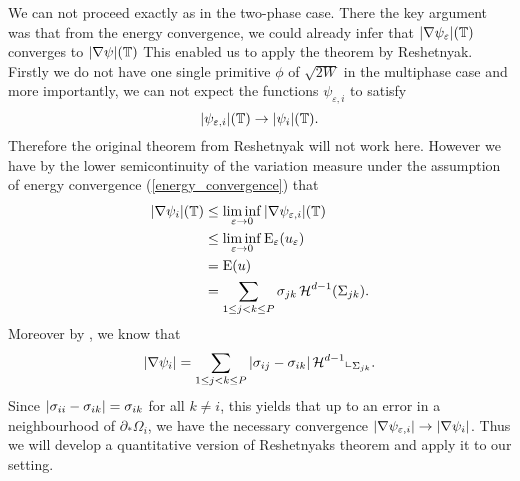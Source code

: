 \begin{remark}
	\label{difference_twophase_multiphase_curvature}
	We can not proceed exactly as in the two-phase case. There the key argument 
	was that from the energy convergence, we could already infer that 
	$ \abs{ \nabla \psi_{ \varepsilon } } ( \operatorname{\mathbb{T}} ) $ converges to $ \abs{ 
	\nabla \psi } ( \operatorname{\mathbb{T}} ) $
	This enabled us to apply the theorem by 
	Reshetnyak. Firstly we do not have one single
	primitive $ \phi $ of $ \sqrt{ 2 W } $ in the multiphase case and more 
	importantly, we can 
	not expect the functions $ 
	\psi_{ \varepsilon ,  i } $ to satisfy 
	\begin{equation}
		\label{energy_convergence_of_psi_i}
		\abs{ \psi_{ \varepsilon ,i } } ( \operatorname{\mathbb{T}} ) \to \abs{ \psi_{ i } } ( 
		\operatorname{\mathbb{T}} ).
	\end{equation}
	Therefore the original theorem from Reshetnyak will not work here. However 
	we have 
	by the lower semicontinuity of the variation measure under the assumption 
	of energy convergence (\ref{energy_convergence}) that
	\begin{align*}
		\abs{ \nabla \psi_{ i } } ( \operatorname{\mathbb{T}} )
		&
		\leq
		\liminf_{ \varepsilon \to 0 }
		\abs{ \nabla \psi_{ \varepsilon , i } } ( \operatorname{\mathbb{T}} )
		\\
		& \leq
		\liminf_{ \varepsilon \to 0 }
		\operatorname{E}_{ \varepsilon } ( u_{ \varepsilon } )
		\\
		& =
		\operatorname{E} ( u )
		\\
		& =
		\sum_{ 1 \leq j < k \leq P }
		\sigma_{ j k }
		\operatorname{\mathcal{H}}^{ d -1 } ( \Sigma_{ j k } ).
	\end{align*}
	Moreover by , we know that
	\begin{equation*}
		\abs{ \nabla \psi_{ i } }
		=
		\sum_{ 1 \leq j < k \leq P }
		\abs{ \sigma_{ i j } - \sigma_{ i k } }
		\operatorname{\mathcal{H}}^{ d - 1 } \llcorner_{ \Sigma_{ j k } }.
	\end{equation*}
	Since $ \abs{ \sigma_{ i i } - \sigma_{ i k } } = \sigma_{ i k } $ for all 
	$ k \neq i $,
	this yields that up to an error in a neighbourhood of $ \partial_{ \ast } 
	\Omega_{ i } $, we have 
	the necessary convergence $ \abs{ \nabla \psi_{ \varepsilon ,i } } \to 
	\abs{ \nabla \psi_{ i } } $. Thus we will develop a quantitative version of 
	Reshetnyaks theorem and apply it to our setting.
\end{remark}

